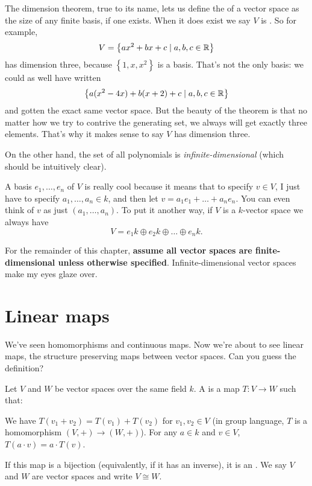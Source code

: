 The dimension theorem, true to its name, lets us define the  of
a vector space as the size of any finite basis, if one exists.
When it does exist we say $V$ is .
So for example,
\[ V = \left\{ ax^2 + bx + c \mid a,b,c \in \mathbb R \right\} \]
has dimension three, because $\left\{ 1,x,x^2 \right\}$ is a basis.
That's not the only basis: we could as well have written
\[ \left\{ a(x^2-4x) + b(x+2) + c \mid a,b,c \in \mathbb R \right\} \]
and gotten the exact same vector space.
But the beauty of the theorem is that no matter how we try
to contrive the generating set, we always will get exactly three elements.
That's why it makes sense to say $V$ has dimension three.

On the other hand, the set of all polynomials is \emph{infinite-dimensional}
(which should be intuitively clear).

A basis $e_1, \dots, e_n$ of $V$ is really cool because it means that to specify $v \in V$, I just have to specify $a_1, \dots, a_n \in k$,
and then let $v = a_1e_1 + \dots + a_ne_n$.
You can even think of $v$ as just $\left( a_1, \dots, a_n \right)$.
To put it another way, if $V$ is a $k$-vector space we always have
\[ V = e_1k \oplus e_2k \oplus \dots \oplus e_nk. \]

For the remainder of this chapter,
\textbf{assume all vector spaces are finite-dimensional
unless otherwise specified}.
Infinite-dimensional vector spaces make my eyes glaze over.

\section{Linear maps}
We've seen homomorphisms and continuous maps.
Now we're about to see linear maps, the structure preserving maps
between vector spaces. Can you guess the definition?

\begin{definition}
	Let $V$ and $W$ be vector spaces over the same field $k$.
	A  is a map $T : V \to W$ such that:
	\begin{enumerate}[(i)]
		\ii We have  $T(v_1 + v_2) = T(v_1) + T(v_2)$ for $v_1, v_2 \in V$
		(in group language, $T$ is a homomorphism $(V,+) \to (W,+)$).
		\ii For any $a \in k$ and $v \in V$, $T(a \cdot v) = a \cdot T(v)$.
	\end{enumerate}
	If this map is a bijection (equivalently, if it has an inverse),
	it is an .
	We say $V$ and $W$ are  vector spaces and write $V \cong W$.
\end{definition}

